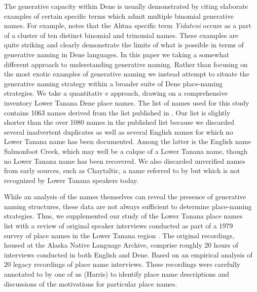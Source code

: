 
The generative capacity within Dene is usually demonstrated by citing elaborate examples of certain specific terms which admit multiple binomial generative names. For example, \citet{kari2008} notes that the Ahtna specific term \textit{Yidateni} occurs as a part of a cluster of ten distinct binomial and trinomial names. These examples are quite striking and clearly demonstrate the limits of what is possible in terms of generative naming in Dene languages. In this paper we taking a somewhat different approach to understanding generative naming. Rather than focusing on the most exotic examples of generative naming we instead attempt to situate the generative naming strategy within a broader suite of Dene place-naming strategies. We take a quantitativ	e approach, drawing on a comprehensive inventory Lower Tanana Dene place names. The list of names  used for this study contains 1063 names derived from the list published in  \citet{kari2012}. Our list is slightly shorter than the over 1080 names in the published list because we discarded several inadvertent duplicates as well as several English names for which no Lower Tanana name has been documented. Among the latter is the English name Salmonfoot Creek, which may well be a calque of a Lower Tanana name, though no Lower Tanana  name has been recovered. We also discarded unverified names from early sources, such as Chaytaltic, a name referred to by \citet{mcmanus1900} but which is not recognized by Lower Tanana speakers today.

While an analysis of the names themselves can reveal the presence of generative naming structures, these data are not always sufficient to determine place-naming strategies. Thus, we supplemented our study of the Lower Tanana place names list with a review of original speaker interviews conducted as part of a 1979 survey of place names in the Lower Tanana region \citep{andrews1980}. The original recordings, housed at the Alaska Native Language Archive, comprise roughly 20 hours of interviews conducted in both English and Dene. Based on an empirical analysis of 20 legacy recordings of place name interviews. These recordings were carefully annotated to by one of us (Harris) to identify place name descriptions and discussions of the motivations for particular place names.



